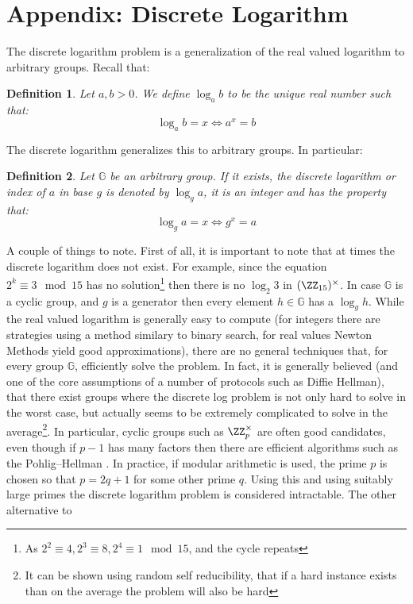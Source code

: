 \documentclass{article}
\newtheorem{definition}{Definition}
\begin{document}
\section{Appendix: Discrete Logarithm}
The discrete logarithm problem is a generalization of the real valued logarithm to arbitrary groups. Recall that:
\begin{definition}
    Let $a, b > 0$. We define $\log_a b$ to be the unique real number  such that:
    \[ \log_a b = x \iff a^x = b \]
\end{definition}
The discrete logarithm generalizes this to arbitrary groups. In particular:
\begin{definition}
    Let $\mathbb{G}$ be an arbitrary group. If it exists, the discrete logarithm or index of $a$ in base $g$ is denoted
    by $\log_g a$, it is an integer and has the property that:
    \[ \log_g a = x \iff g^x = a \]
\end{definition}
A couple of things to note. First of all, it is important to note that at times the discrete logarithm does not exist.
For example, since the equation $2^k \equiv 3 \mod 15$ has no solution\footnote{As $2^2 \equiv 4, 2^3 \equiv 8, 2^4 \equiv 1 \mod 15$, and the cycle repeats}
then there is no $\log_2 3$ in $(\ZZ_{15})^\times$. In case $\mathbb{G}$ is a cyclic group, and $g$ is a generator then
every element $h \in \mathbb{G}$ has a $\log_g h$. While the real valued logarithm is generally easy to compute (for integers there
are strategies using a method similary to binary search, for real values Newton Methods yield good approximations), there are no
general techniques that, for every group $\mathbb{G}$, efficiently solve the problem. In fact, it is generally believed (and one
of the core assumptions of a number of protocols such as Diffie Hellman), that there exist groups where the discrete log problem
is not only hard to solve in the worst case, but actually seems to be extremely complicated to solve in the average\footnote{It can be shown
    using random self reducibility, that if a hard instance exists than on the average the problem will also be hard}.
In particular, cyclic groups such as $\ZZ_p^\times$ are often good candidates, even though if $p - 1$ has many factors
then there are efficient algorithms such as the Pohlig–Hellman \cite{pohligImprovedAlgorithmComputing1978}. In practice,
if modular arithmetic is used, the prime $p$ is chosen so that $p = 2q + 1$ for some other prime $q$. Using this and using
suitably large primes the discrete logarithm problem is considered intractable. The other alternative to
\end{document}
